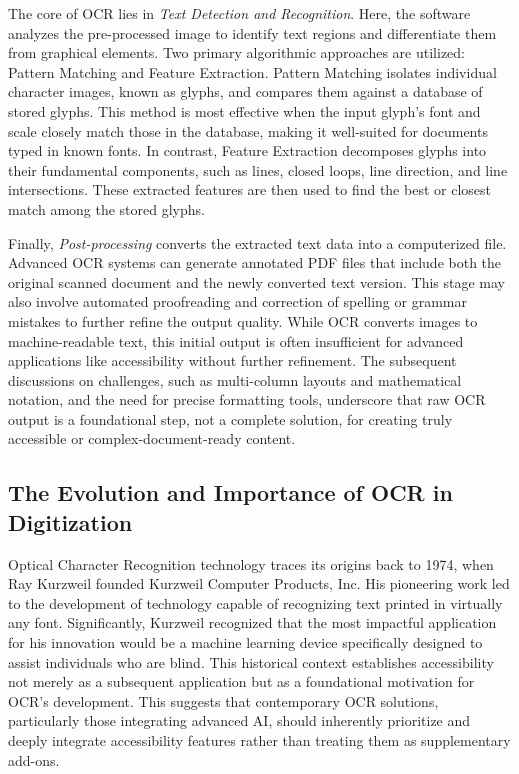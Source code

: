 The core of OCR lies in \emph{Text Detection and Recognition}. Here, the software analyzes the pre-processed image to identify text regions and differentiate them from graphical elements. Two primary algorithmic approaches are utilized: Pattern Matching and Feature Extraction. Pattern Matching isolates individual character images, known as glyphs, and compares them against a database of stored glyphs. This method is most effective when the input glyph's font and scale closely match those in the database, making it well-suited for documents typed in known fonts. \cite{AWSOCR,AdobeOCR} In contrast, Feature Extraction decomposes glyphs into their fundamental components, such as lines, closed loops, line direction, and line intersections. These extracted features are then used to find the best or closest match among the stored glyphs. \cite{AWSOCR,AdobeOCR}

Finally, \emph{Post-processing} converts the extracted text data into a computerized file. Advanced OCR systems can generate annotated PDF files that include both the original scanned document and the newly converted text version. This stage may also involve automated proofreading and correction of spelling or grammar mistakes to further refine the output quality. \cite{AWSOCR,AdobeOCR,ContinualEngineOCR} While OCR converts images to machine-readable text, this initial output is often insufficient for advanced applications like accessibility without further refinement. The subsequent discussions on challenges, such as multi-column layouts and mathematical notation, and the need for precise formatting tools, underscore that raw OCR output is a foundational step, not a complete solution, for creating truly accessible or complex-document-ready content.

\subsection{The Evolution and Importance of OCR in Digitization}

Optical Character Recognition technology traces its origins back to 1974, when Ray Kurzweil founded Kurzweil Computer Products, Inc. His pioneering work led to the development of technology capable of recognizing text printed in virtually any font. \cite{AdobeOCR} Significantly, Kurzweil recognized that the most impactful application for his innovation would be a machine learning device specifically designed to assist individuals who are blind. \cite{AdobeOCR} This historical context establishes accessibility not merely as a subsequent application but as a foundational motivation for OCR's development. This suggests that contemporary OCR solutions, particularly those integrating advanced AI, should inherently prioritize and deeply integrate accessibility features rather than treating them as supplementary add-ons.


